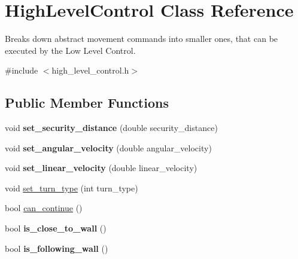 \hypertarget{classHighLevelControl}{\section{High\-Level\-Control Class Reference}
\label{classHighLevelControl}
}


Breaks down abstract movement commands into smaller ones, that can be executed by the Low Level Control.  




{\ttfamily \#include $<$high\-\_\-level\-\_\-control.\-h$>$}

\subsection*{Public Member Functions}
\begin{DoxyCompactItemize}
\item 
\hypertarget{classHighLevelControl_aac1848a3223d2a4441a54c00cb4e3af6}{void {\bfseries set\-\_\-security\-\_\-distance} (double security\-\_\-distance)}\label{classHighLevelControl_aac1848a3223d2a4441a54c00cb4e3af6}

\item 
\hypertarget{classHighLevelControl_a15fd2a5a71a2dfee668153fa217dd4a3}{void {\bfseries set\-\_\-angular\-\_\-velocity} (double angular\-\_\-velocity)}\label{classHighLevelControl_a15fd2a5a71a2dfee668153fa217dd4a3}

\item 
\hypertarget{classHighLevelControl_a9e0d860131c93c51b54bbf741fb87c84}{void {\bfseries set\-\_\-linear\-\_\-velocity} (double linear\-\_\-velocity)}\label{classHighLevelControl_a9e0d860131c93c51b54bbf741fb87c84}

\item 
void \hyperlink{classHighLevelControl_a3d6185ee401e05141c4c8ce504f7fd74}{set\-\_\-turn\-\_\-type} (int turn\-\_\-type)
\item 
bool \hyperlink{classHighLevelControl_ac66b63d8f13f54a2e4a13da35c0701b0}{can\-\_\-continue} ()
\item 
\hypertarget{classHighLevelControl_ab958c89bc1762671d14b967b15dccfb8}{bool {\bfseries is\-\_\-close\-\_\-to\-\_\-wall} ()}\label{classHighLevelControl_ab958c89bc1762671d14b967b15dccfb8}

\item 
\hypertarget{classHighLevelControl_acfa4985eb2022acd8b59886657877acf}{bool {\bfseries is\-\_\-following\-\_\-wall} ()}\label{classHighLevelControl_acfa4985eb2022acd8b59886657877acf}


\end{DoxyCompactItemize}
